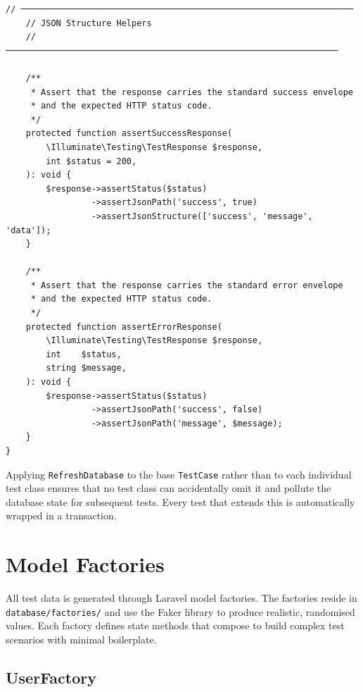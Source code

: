 \begin{lstlisting}[style=php, caption={\texttt{tests/TestCase.php} ---
  Base test case with Passport configuration and shared helpers.}]
    // ──────────────────────────────────────────────────────────────────
    // JSON Structure Helpers
    // ──────────────────────────────────────────────────────────────────

    /**
     * Assert that the response carries the standard success envelope
     * and the expected HTTP status code.
     */
    protected function assertSuccessResponse(
        \Illuminate\Testing\TestResponse $response,
        int $status = 200,
    ): void {
        $response->assertStatus($status)
                 ->assertJsonPath('success', true)
                 ->assertJsonStructure(['success', 'message', 'data']);
    }

    /**
     * Assert that the response carries the standard error envelope
     * and the expected HTTP status code.
     */
    protected function assertErrorResponse(
        \Illuminate\Testing\TestResponse $response,
        int    $status,
        string $message,
    ): void {
        $response->assertStatus($status)
                 ->assertJsonPath('success', false)
                 ->assertJsonPath('message', $message);
    }
}
\end{lstlisting}

\begin{notebox}
  Applying \texttt{RefreshDatabase} to the base \texttt{TestCase} rather
  than to each individual test class ensures that no test class can
  accidentally omit it and pollute the database state for subsequent
  tests. Every test that extends this  is
  automatically wrapped in a transaction.
\end{notebox}

\section{Model Factories}
\label{sec:factories}

All test data is generated through Laravel model factories. The
factories reside in \texttt{database/factories/} and use the Faker
library to produce realistic, randomised values. Each factory defines
state methods that compose to build complex test scenarios with minimal
boilerplate.

\subsection{UserFactory}

